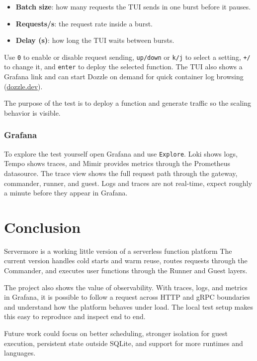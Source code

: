 \documentclass[11pt,a4paper]{article}
\begin{document}
\begin{itemize}[leftmargin=*]
	\item \textbf{Batch size}: how many requests the TUI sends in one burst before it pauses.
	\item \textbf{Requests/s}: the request rate inside a burst.
	\item \textbf{Delay (s)}: how long the TUI waits between bursts.
\end{itemize}

Use \texttt{0} to enable or disable request sending, \texttt{up/down} or
\texttt{k/j} to select a setting, \texttt{+/\-} to change it, and
\texttt{enter} to deploy the selected function. The TUI also shows a Grafana
link and can start Dozzle on demand for quick container log browsing
(\href{https://dozzle.dev/}{dozzle.dev}).

The purpose of the test is to deploy a function and generate traffic so the
scaling behavior is visible.

\subsubsection{Grafana}

To explore the test yourself open Grafana and use \texttt{Explore}. Loki shows logs, Tempo shows traces, and
Mimir provides metrics through the Prometheus datasource. The trace view shows
the full request path through the gateway, commander, runner, and guest. Logs
and traces are not real-time, expect roughly a minute before they appear in
Grafana.

\section{Conclusion}

Servermore is a working little version of a serverless function platform
The current version handles cold starts and warm reuse, routes requests
through the Commander, and executes user functions through the Runner and Guest
layers.

The project also shows the value of observability. With traces, logs, and
metrics in Grafana, it is possible to follow a request across HTTP and gRPC
boundaries and understand how the platform behaves under load. The local test
setup makes this easy to reproduce and inspect end to end.

Future work could focus on better scheduling, stronger isolation for guest
execution, persistent state outside SQLite, and support for more runtimes and
languages.
\end{document}
